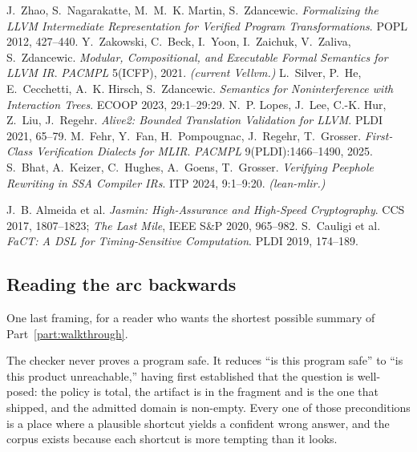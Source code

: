 \begin{description}[leftmargin=1.2em,style=unboxed,itemsep=2pt]
\item[Mechanized LLVM and MLIR.]
J.~Zhao, S.~Nagarakatte, M.~M.~K. Martin, S.~Zdancewic. \emph{Formalizing the
LLVM Intermediate Representation for Verified Program Transformations}. POPL
2012, 427--440.\quad
Y.~Zakowski, C.~Beck, I.~Yoon, I.~Zaichuk, V.~Zaliva, S.~Zdancewic.
\emph{Modular, Compositional, and Executable Formal Semantics for LLVM IR}.
\emph{PACMPL} 5(ICFP), 2021. \emph{(current Vellvm.)}\quad
L.~Silver, P.~He, E.~Cecchetti, A.~K. Hirsch, S.~Zdancewic. \emph{Semantics for
Noninterference with Interaction Trees}. ECOOP 2023, 29:1--29:29.\quad
N.~P. Lopes, J.~Lee, C.-K. Hur, Z.~Liu, J.~Regehr. \emph{Alive2: Bounded
Translation Validation for LLVM}. PLDI 2021, 65--79.\quad
M.~Fehr, Y.~Fan, H.~Pompougnac, J.~Regehr, T.~Grosser. \emph{First-Class
Verification Dialects for MLIR}. \emph{PACMPL} 9(PLDI):1466--1490, 2025.\quad
S.~Bhat, A.~Keizer, C.~Hughes, A.~Goens, T.~Grosser. \emph{Verifying Peephole
Rewriting in SSA Compiler IRs}. ITP 2024, 9:1--9:20. \emph{(lean-mlir.)}

\item[Constant-time by construction.]
J.~B. Almeida et al. \emph{Jasmin: High-Assurance and High-Speed Cryptography}.
CCS 2017, 1807--1823; \emph{The Last Mile}, IEEE S\&P 2020, 965--982.\quad
S.~Cauligi et al. \emph{FaCT: A DSL for Timing-Sensitive Computation}. PLDI
2019, 174--189.

\end{description}
\endgroup

\subsection{Reading the arc backwards}

One last framing, for a reader who wants the shortest possible summary of
Part~\ref{part:walkthrough}.

The checker never proves a program safe. It reduces ``is this program safe'' to
``is this product unreachable,'' having first established that the question is
well-posed: the policy is total, the artifact is in the fragment and is the one
that shipped, and the admitted domain is non-empty. Every one of those
preconditions is a place where a plausible shortcut yields a confident wrong
answer, and the corpus exists because each shortcut is more tempting than it
looks.
